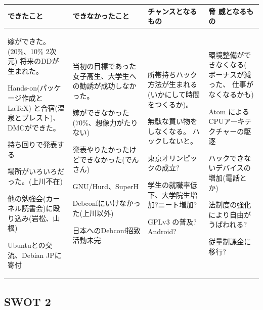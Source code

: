\documentclass[mingoth,a4paper]{jsarticle}
\begin{document}
{\large
\begin{tabular}[t]{|p{8em}|p{8em}|p{8em}|p{8em}|}
\hline
できたこと & できなかったこと & チャンスとなるもの & 脅
 威となるもの \\
\hline
嫁ができた。(20\%、10\% 2次元)
将来のDDが生まれた。

Hands-on(パッケージ作成と\LaTeX{}) と合宿(温泉とブレスト)、
DMCができた。

持ち回りで発表する

場所がいろいろだった。(上川不在)

他の勉強会(カーネル読書会)に殴り込み(岩松、山根)

Ubuntuとの交流、Debian JPに寄付



&

当初の目標であった女子高生、大学生への勧誘が成功しなかった。

嫁ができなかった(70\%、想像力がたりない)

発表やりたかったけどできなかった(でんさん)

GNU/Hurd、SuperH

Debconfにいけなかった(上川以外)

日本へのDebconf招致活動未完

&
	 
所帯持ちハック方法が生まれる(いかにして時間をつくるか)。

無駄な買い物をしなくなる。
ハックしないと。

東京オリンピックの成立?

学生の就職率低下、大学院生増加?ニート増加?

GPLv3 の普及?
Android?

&

環境整備ができなくなる(
ボーナスが減った、
仕事がなくなるかも)

Atom によるCPUアーキテクチャーの駆逐

ハックできないデバイスの増加(電話とか)

法制度の強化により自由がうばわれる?

従量制課金に移行?

\\
\hline
\end{tabular}
}

\subsection{SWOT 2}
\end{document}
